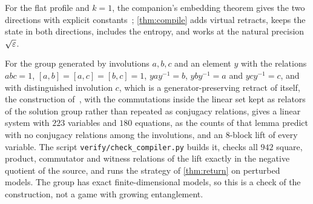 For the flat profile and $k=1$, the companion's embedding theorem gives the two directions with explicit
constants~\cite[Theorem~B.3]{DM-game}; \cref{thm:compile} adds virtual retracts, keeps the state in both directions, includes the
entropy, and works at the natural precision $\sqrt{\varepsilon}$.

\begin{remark}\label{rem:compile-instance}
For the group generated by involutions $a,b,c$ and an element $y$ with the relations $abc=1$, $[a,b]=[a,c]=[b,c]=1$,
$yay^{-1}=b$, $yby^{-1}=a$ and $ycy^{-1}=c$, and with distinguished involution $c$, which is a generator-preserving retract
of itself, the construction of~\cite[Lemma~B.1]{DM-game}, with the commutations inside the linear set kept as relators of
the solution group rather than repeated as conjugacy relations, gives a linear system with $223$ variables and $180$ equations,
as the counts of that lemma predict with no conjugacy relations among the involutions, and an $8$-block lift of every
variable. The script \texttt{verify/check\_compiler.py} builds it, checks all $942$ square, product, commutator and witness
relations of the lift exactly in the negative quotient of the source, and runs the strategy of \cref{thm:return} on
perturbed models. The group has exact finite-dimensional models, so this is a check of the construction, not a game with
growing entanglement.
\end{remark}

